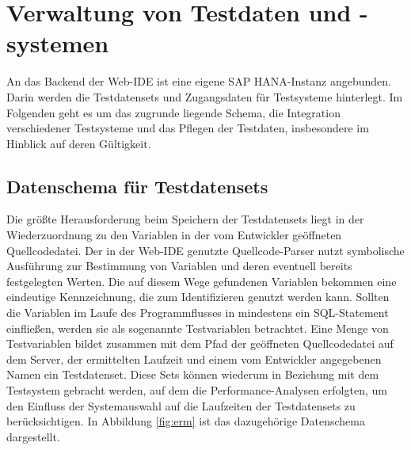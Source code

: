 \section{Verwaltung von Testdaten und -systemen}\label{chap:testdataadministration}

%
%

An das Backend der Web-IDE ist eine eigene SAP HANA-Instanz angebunden.
Darin werden die Testdatensets und Zugangsdaten für Testsysteme hinterlegt.
Im Folgenden geht es um das zugrunde liegende Schema, die Integration verschiedener Testsysteme und das Pflegen der Testdaten, insbesondere im Hinblick auf deren Gültigkeit.

\subsection{Datenschema für Testdatensets}
Die größte Herausforderung beim Speichern der Testdatensets liegt in der Wiederzuordnung zu den Variablen in der vom Entwickler geöffneten Quellcodedatei.
Der in der Web-IDE genutzte Quellcode-Parser \cite{Horschig2014} nutzt symbolische Ausführung \cite{DBLP:journals/cacm/King76} zur Bestimmung von Variablen und deren eventuell bereits festgelegten Werten.
Die auf diesem Wege gefundenen Variablen bekommen eine eindeutige Kennzeichnung, die zum Identifizieren genutzt werden kann.
Sollten die Variablen im Laufe des Programmflusses in mindestens ein SQL-Statement einfließen, werden sie als sogenannte Testvariablen betrachtet.
Eine Menge von Testvariablen bildet zusammen mit dem Pfad der geöffneten Quellcodedatei auf dem Server, der ermittelten Laufzeit und einem vom Entwickler angegebenen Namen ein Testdatenset.
Diese Sets können wiederum in Beziehung mit dem Testsystem gebracht werden, auf dem die Performance-Analysen erfolgten, um den Einfluss der Systemauswahl auf die Laufzeiten der Testdatensets zu berücksichtigen.
In Abbildung \ref{fig:erm} ist das dazugehörige Datenschema dargestellt.

\newcommand {\key}[1]{\underline{#1}}

